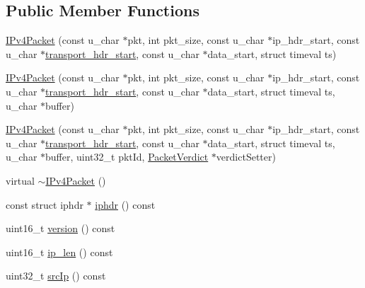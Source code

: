 \subsection*{Public Member Functions}
\begin{DoxyCompactItemize}
\item 
\hyperlink{class_vsid_common_1_1_i_pv4_packet_ab0da103979f1104a1b1e2c75a9abd1c2}{I\-Pv4\-Packet} (const u\-\_\-char $\ast$pkt, int pkt\-\_\-size, const u\-\_\-char $\ast$ip\-\_\-hdr\-\_\-start, const u\-\_\-char $\ast$\hyperlink{class_vsid_common_1_1_i_pv4_packet_a2318e0a0cc6d297eda5c4eb57682eb09}{transport\-\_\-hdr\-\_\-start}, const u\-\_\-char $\ast$data\-\_\-start, struct timeval ts)
\item 
\hyperlink{class_vsid_common_1_1_i_pv4_packet_ab103f986666c11f28fbb03ea1f0dd21e}{I\-Pv4\-Packet} (const u\-\_\-char $\ast$pkt, int pkt\-\_\-size, const u\-\_\-char $\ast$ip\-\_\-hdr\-\_\-start, const u\-\_\-char $\ast$\hyperlink{class_vsid_common_1_1_i_pv4_packet_a2318e0a0cc6d297eda5c4eb57682eb09}{transport\-\_\-hdr\-\_\-start}, const u\-\_\-char $\ast$data\-\_\-start, struct timeval ts, u\-\_\-char $\ast$buffer)
\item 
\hyperlink{class_vsid_common_1_1_i_pv4_packet_a70985349f2c1d53d708e8761e70a106d}{I\-Pv4\-Packet} (const u\-\_\-char $\ast$pkt, int pkt\-\_\-size, const u\-\_\-char $\ast$ip\-\_\-hdr\-\_\-start, const u\-\_\-char $\ast$\hyperlink{class_vsid_common_1_1_i_pv4_packet_a2318e0a0cc6d297eda5c4eb57682eb09}{transport\-\_\-hdr\-\_\-start}, const u\-\_\-char $\ast$data\-\_\-start, struct timeval ts, u\-\_\-char $\ast$buffer, uint32\-\_\-t pkt\-Id, \hyperlink{class_vsid_common_1_1_packet_verdict}{Packet\-Verdict} $\ast$verdict\-Setter)
\item 
virtual \hyperlink{class_vsid_common_1_1_i_pv4_packet_acd65245866cf5fafbf2d709b22cefa49}{$\sim$\-I\-Pv4\-Packet} ()
\item 
const struct iphdr $\ast$ \hyperlink{class_vsid_common_1_1_i_pv4_packet_af3c00b2854ad766cf194bf12c99da86c}{iphdr} () const 
\item 
uint16\-\_\-t \hyperlink{class_vsid_common_1_1_i_pv4_packet_afc572d33e3813745c3a7c97e5adb444e}{version} () const 
\item 
uint16\-\_\-t \hyperlink{class_vsid_common_1_1_i_pv4_packet_a3a373823b0702a77a525aeecd7ca8087}{ip\-\_\-len} () const 
\item 
uint32\-\_\-t \hyperlink{class_vsid_common_1_1_i_pv4_packet_ab659b369af59b2745479e9080e0a0c54}{src\-Ip} () const 
\item 

\end{DoxyCompactItemize}
